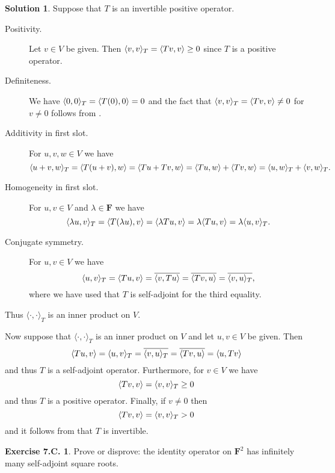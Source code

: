 \documentclass[12pt]{article}
\theoremstyle{definition}
\theoremstyle{exercise}
\newtheorem{exercise}{Exercise 7.C.}
\theoremstyle{solution}
\newtheorem*{solution}{Solution}
\newcommand{\ipanon}{\langle \cdot, \cdot \rangle}
\newcommand{\F}{\mathbf{F}}
\DeclarePairedDelimiter\ip{\langle}{\rangle}
\begin{document}
\begin{solution}
    Suppose that \( T \) is an invertible positive operator.
    \begin{description}
        \item[Positivity.] Let \( v \in V \) be given. Then \( \ip{v, v}_T = \ip{Tv, v} \geq 0 \) since \( T \) is a positive operator.

        \item[Definiteness.] We have \( \ip{0, 0}_T = \ip{T(0), 0} = 0 \) and the fact that \( \ip{v, v}_T = \ip{Tv, v} \neq 0 \) for \( v \neq 0 \) follows from .

        \item[Additivity in first slot.] For \( u, v, w \in V \) we have
        \[
            \ip{u + v, w}_T = \ip{T(u + v), w} = \ip{Tu + Tv, w} = \ip{Tu, w} + \ip{Tv, w} = \ip{u, w}_T + \ip{v, w}_T.
        \]

        \item[Homogeneity in first slot.] For \( u, v \in V \) and \( \lambda \in \F \) we have
        \[
            \ip{\lambda u, v}_T = \ip{T(\lambda u), v} = \ip{\lambda Tu, v} = \lambda \ip{Tu, v} = \lambda \ip{u, v}_T.
        \]

        \item[Conjugate symmetry.] For \( u, v \in V \) we have
        \[
            \ip{u, v}_T = \ip{Tu, v} = \overline{\ip{v, Tu}} = \overline{\ip{Tv, u}} = \overline{\ip{v, u}_T},
        \]
        where we have used that \( T \) is self-adjoint for the third equality.
    \end{description}
    Thus \( \ipanon_T \) is an inner product on \( V \).

    Now suppose that \( \ipanon_T \) is an inner product on \( V \) and let \( u, v \in V \) be given. Then
    \[
        \ip{Tu, v} = \ip{u, v}_T = \overline{\ip{v, u}_T} = \overline{\ip{Tv, u}} = \ip{u, Tv}
    \]
    and thus \( T \) is a self-adjoint operator. Furthermore, for \( v \in V \) we have
    \[
        \ip{Tv, v} = \ip{v, v}_T \geq 0 
    \]
    and thus \( T \) is a positive operator. Finally, if \( v \neq 0 \) then
    \[
        \ip{Tv, v} = \ip{v, v}_T > 0
    \]
    and it follows from  that \( T \) is invertible.
\end{solution}

\begin{exercise}
\label{ex:9}
    Prove or disprove: the identity operator on \( \F^2 \) has infinitely many self-adjoint square roots.
\end{exercise}
\end{document}
